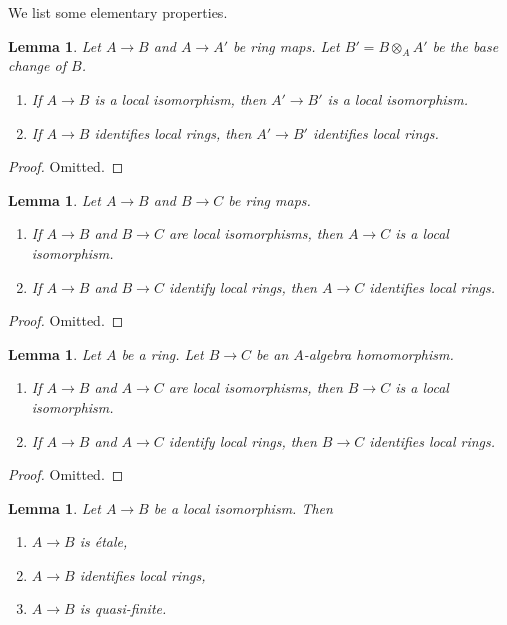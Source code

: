\documentclass[10pt,a4paper]{article}
\theoremstyle{plain}
\newtheorem{lemma}[subsection]{Lemma}
\theoremstyle{definition}
\theoremstyle{remark}
\numberwithin{equation}{subsection}
\begin{document}
\noindent
We list some elementary properties.

\begin{lemma}
\label{lemma-base-change-local-isomorphism}
Let $A \to B$ and $A \to A'$ be ring maps. Let $B' = B \otimes_A A'$
be the base change of $B$.
\begin{enumerate}
\item If $A \to B$ is a local isomorphism, then $A' \to B'$ is a
local isomorphism.
\item If $A \to B$ identifies local rings, then $A' \to B'$
identifies local rings.
\end{enumerate}
\end{lemma}

\begin{proof}
Omitted.
\end{proof}

\begin{lemma}
\label{lemma-composition-local-isomorphism}
Let $A \to B$ and $B \to C$ be ring maps.
\begin{enumerate}
\item If $A \to B$ and $B \to C$ are local isomorphisms, then $A \to C$
is a local isomorphism.
\item If $A \to B$ and $B \to C$ identify local rings, then $A \to C$
identifies local rings.
\end{enumerate}
\end{lemma}

\begin{proof}
Omitted.
\end{proof}

\begin{lemma}
\label{lemma-local-isomorphism-permanence}
Let $A$ be a ring. Let $B \to C$ be an $A$-algebra homomorphism.
\begin{enumerate}
\item If $A \to B$ and $A \to C$ are local isomorphisms, then $B \to C$
is a local isomorphism.
\item If $A \to B$ and $A \to C$ identify local rings, then $B \to C$
identifies local rings.
\end{enumerate}
\end{lemma}

\begin{proof}
Omitted.
\end{proof}

\begin{lemma}
\label{lemma-local-isomorphism-implies}
Let $A \to B$ be a local isomorphism. Then
\begin{enumerate}
\item $A \to B$ is \'etale,
\item $A \to B$ identifies local rings,
\item $A \to B$ is quasi-finite.
\end{enumerate}
\end{lemma}
\end{document}
